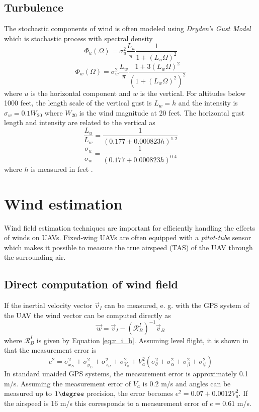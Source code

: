 \subsection{Turbulence}
The stochastic components of wind is often modeled using \textit{Dryden's Gust Model} which is stochastic process with spectral density 
\begin{equation}
    \Phi_u(\Omega)=\sigma_u^2\frac{L_u}{\pi}\frac{1}{1+(L_u\Omega)^2}
\end{equation}
\begin{equation}
    \Phi_w(\Omega)=\sigma_w^2\frac{L_w}{\pi}\frac{1 + 3(L_w\Omega)^2}{(1+(L_w\Omega)^2)^2}
\end{equation}
where $u$ is the horizontal component and $w$ is the vertical. For altitudes below 1000 feet, the length scale of the vertical gust is 
$L_w=h$ and the intensity is $\sigma_w=0.1W_{20}$ where $W_{20}$ is the wind magnitude at 20 feet. The horizontal gust length and intensity are related to the vertical as 
\begin{equation}
    \frac{L_u}{L_w}=\frac{1}{(0.177 + 0.000823h)^{1.2}}
\end{equation}
\begin{equation}
    \frac{\sigma_u}{\sigma_w}=\frac{1}{(0.177 + 0.000823h)^{0.4}}
\end{equation}
where $h$ is measured in feet \cite{wind_direct_computation}.

\section{Wind estimation}
Wind field estimation techniques are important for efficiently handling the effects of winds on UAVs. 
Fixed-wing UAVs are often equipped with a \textit{pitot-tube} sensor which makes it possible to measure the 
true airspeed (TAS) of the UAV through the surrounding air.
\subsection{Direct computation of wind field}
If the inertial velocity vector $\vec{v}_I$ can be measured, e. g. with the GPS system of the UAV the wind vector can be 
computed directly as 
\begin{equation}
    \vec{w} = \vec{v}_I - (\mathcal{R}^I_B)^{-1}\vec{v}_B
\end{equation}
where $\mathcal{R}^I_B$ is given by Equation \eqref{eq:r_i_b}. Assuming level flight, it is shown in \cite{wind_direct_computation} that 
the measurement error is
\begin{equation}
    e^2=\sigma_{\dot{x}_N}^2+\sigma_{\dot{y}_E}^2+\sigma_{\dot{z}_H}^2+\sigma_{V_a}^2 + V_a^2(\sigma_{\theta}^2+\sigma_{\alpha}^2+\sigma_{\beta}^2+\sigma_{\psi}^2)
\end{equation}
In standard unaided GPS systems, the measurement error is approximately 0.1 m/s. Assuming the measurement error of $V_a$ is 0.2 m/s and angles 
can be measured up to $1\degree$ precision, the error becomes $e^2=0.07+0.0012V_a^2$. If the airspeed is 16 m/s this corresponds to a measurement error of 
$e=0.61$ m/s.
